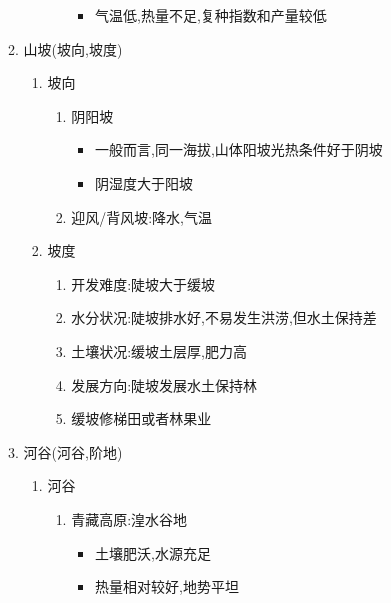 \documentclass[a4paper]{article}
\begin{document}
\begin{enumerate}
\begin{enumerate}
\begin{enumerate}
\begin{enumerate}
                    \begin{itemize}
                        \item 气温低,热量不足,复种指数和产量较低
                    \end{itemize}
                \end{enumerate}
            \end{enumerate}
            \item 山坡(坡向,坡度)
            \begin{enumerate}
                \item 坡向
                \begin{enumerate}
                    \item 阴阳坡
                    \begin{itemize}
                        \item 一般而言,同一海拔,山体阳坡光热条件好于阴坡
                        \item 阴湿度大于阳坡
                    \end{itemize}
                    \item 迎风/背风坡:降水,气温
                \end{enumerate}
                \item 坡度
                \begin{enumerate}
                    \item 开发难度:陡坡大于缓坡
                    \item 水分状况:陡坡排水好,不易发生洪涝,但水土保持差
                    \item 土壤状况:缓坡土层厚,肥力高
                    \item 发展方向:陡坡发展水土保持林
                    \item 缓坡修梯田或者林果业
                \end{enumerate}
            \end{enumerate}
            \item 河谷(河谷,阶地)
            \begin{enumerate}
                \item 河谷
                \begin{enumerate}
                    \item 青藏高原:湟水谷地
                    \begin{itemize}
                        \item 土壤肥沃,水源充足
                        \item 热量相对较好,地势平坦

\end{itemize}
\end{enumerate}
\end{enumerate}
\end{enumerate}
\end{enumerate}
\end{document}

